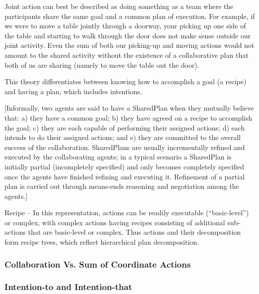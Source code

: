 \documentclass[11pt]{article}
\begin{document}
Joint action can best be described as doing something as a team where the
participants share the same goal and a common plan of execution. For example, if
we were to move a table jointly through a doorway, your picking up one side of
the table and starting to walk through the door does not make sense outside our
joint activity. Even the sum of both our picking-up and moving actions would not
amount to the shared activity without the existence of a collaborative plan that
both of us are sharing (namely to move the table out the door).

This theory differentiates between knowing how to accomplish a goal (a recipe)
and having a plan, which includes intentions. 

[Informally, two agents are said to have a SharedPlan when  they mutually
believe that: a) they have a common goal; b) they have agreed on a recipe to accomplish
the goal; c) they are each capable of performing their assigned actions; d) each
intends to do their assigned actions; and e) they are committed to the overall
success of the collaboration. SharedPlans are usually incrementally refined and
executed by the collaborating agents; in a typical scenario a SharedPlan is
initially partial (incompletely specified) and only becomes completely specified
once the agents have finished refining and executing it. Refinement of a partial
plan is carried out through means-ends reasoning and negotiation among the
agents.]

Recipe -- In this representation, actions can be readily executable
(“basic-level”) or complex, with complex actions having recipes consisting of
additional sub-actions that are basic-level or complex. Thus actions and their
decomposition form recipe trees, which reflect hierarchical plan decomposition.


\subsubsection{Collaboration Vs. Sum of Coordinate Actions}

\cite{grosz:collaborative-systems}

\subsubsection{Intention-to and Intention-that}
\label{sec:intend-to-that}
\end{document}

